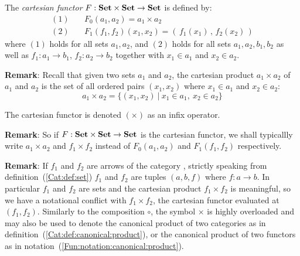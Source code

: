 \begin{defin}\label{Fun:def:cartesian}
    The {\em cartesian functor} $F:\mbox{\bf Set}\times\mbox{\bf Set}\to\mbox{\bf Set}$ is defined by:
        \begin{eqnarray*}
            (1)&\ &F_{0}(a_{1},a_{2}) = a_{1}\times a_{2}\\
            (2)&\ &F_{1}(f_{1},f_{2})(x_{1},x_{2})
                =(\,f_{1}(x_{1})\,,\,f_{2}(x_{2})\,)
        \end{eqnarray*}
    where $(1)$ holds for all sets $a_{1},a_{2}$, and $(2)$ holds for all
    sets $a_{1},a_{2},b_{1},b_{2}$ as well as $f_{1}:a_{1}\to b_{1}$, 
    $f_{2}:a_{2}\to b_{2}$ together with $x_{1}\in a_{1}$ and $x_{2}\in a_{2}$.
\end{defin}

\noindent
{\bf Remark}: Recall that given two sets $a_{1}$ and $a_{2}$, the cartesian
product $a_{1}\times a_{2}$ of $a_{1}$ and $a_{2}$ is the set of all
ordered pairs $(x_{1},x_{2})$ where $x_{1}\in a_{1}$ and $x_{2}\in a_{2}$:
    \[
    a_{1}\times a_{2}=\{(x_{1},x_{2})\ |\ x_{1}\in a_{1},\ x_{2}\in a_{2}\}
    \]

\begin{notation}\label{Fun:notation:cartesian}
    The cartesian functor is denoted $(\times)$ as an infix operator.
\end{notation}

\noindent
{\bf Remark}: So if $F:\mbox{\bf Set}\times\mbox{\bf Set}\to\mbox{\bf Set}$ is the cartesian functor, we 
shall typicallly write $a_{1}\times a_{2}$ and $f_{1}\times f_{2}$ instead
of $F_{0}(a_{1},a_{2})$ and $F_{1}(f_{1},f_{2})$ respectively.

{\bf Remark}: If $f_{1}$ and $f_{2}$ are arrows of the category \Set, strictly
speaking from definition~(\ref{Cat:def:set}) $f_{1}$ and $f_{2}$ are tuples
$(a,b,f)$ where $f:a\to b$. In particular $f_{1}$ and $f_{2}$ are sets and
the cartesian product $f_{1}\times f_{2}$ is meaningful, so we have a 
notational conflict with $f_{1}\times f_{2}$, the cartesian
functor evaluated at $(f_{1},f_{2})$. Similarly to the composition $\circ$, 
the symbol $\times$ is highly overloaded and may also be used to denote the 
canonical product of two categories as in 
definition~(\ref{Cat:def:canonical:product}), or the canonical product of
two functors as in notation~(\ref{Fun:notation:canonical:product}).

